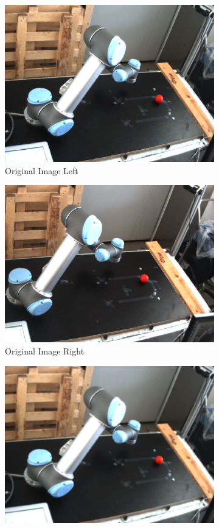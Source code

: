 \begin{figure}[ht!]
\begin{subfigure}{.5\textwidth}
  \centering
  \includegraphics[width=.8\linewidth]{Images/left.png}
  \caption{Original Image Left}
  \label{fig:sfig1}
\end{subfigure}
\begin{subfigure}{.5\textwidth}
  \centering
  \includegraphics[width=.8\linewidth]{Images/right.png}
  \caption{Original Image Right}
  \label{fig:sfig2}
\end{subfigure}
\begin{subfigure}{.5\textwidth}
  \centering
  \includegraphics[width=.8\linewidth]{Images/blurred_left.png}

\end{subfigure}
\end{figure}
